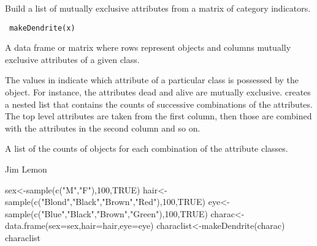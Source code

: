 \begin{Description}\relax
Build a list of mutually exclusive attributes from a matrix of 
category indicators.
\end{Description}
\begin{Usage}
\begin{verbatim}
 makeDendrite(x)
\end{verbatim}
\end{Usage}
\begin{Arguments}
\begin{ldescription}
\item[\code{x}] A data frame or matrix where rows represent objects and columns
mutually exclusive attributes of a given class.
\end{ldescription}
\end{Arguments}
\begin{Details}\relax
The values in  indicate which attribute of a particular class is
possessed by the object. For instance, the attributes dead and alive are
mutually exclusive.  creates a nested list that contains
the counts of successive combinations of the attributes. The top level
attributes are taken from the first column, then those are combined with
the attributes in the second column and so on.
\end{Details}
\begin{Value}
A list of the counts of objects for each combination of the attribute
classes.
\end{Value}
\begin{Author}\relax
Jim Lemon
\end{Author}
\begin{SeeAlso}\relax
{}
\end{SeeAlso}
\begin{Examples}
\begin{ExampleCode}
 sex<-sample(c("M","F"),100,TRUE)
 hair<-sample(c("Blond","Black","Brown","Red"),100,TRUE)
 eye<-sample(c("Blue","Black","Brown","Green"),100,TRUE)
 charac<-data.frame(sex=sex,hair=hair,eye=eye)
 characlist<-makeDendrite(charac)
 characlist
\end{ExampleCode}
\end{Examples}

